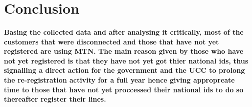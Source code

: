 \documentclass[12pt]{report}
\begin{document}
\section{Conclusion}
\paragraph{Basing the collected data and after analysing it critically, most of the customers that were disconnected and those that have not yet registered are using MTN. The main reason given by those who have not yet registered is that they have not yet got thier national ids, thus signalling a direct action for the government and the UCC to prolong the re-registration activity for a full year hence giving appropreate time to those that have not yet proccessed their national ids to do so thereafter register their lines. }
\end{document}
